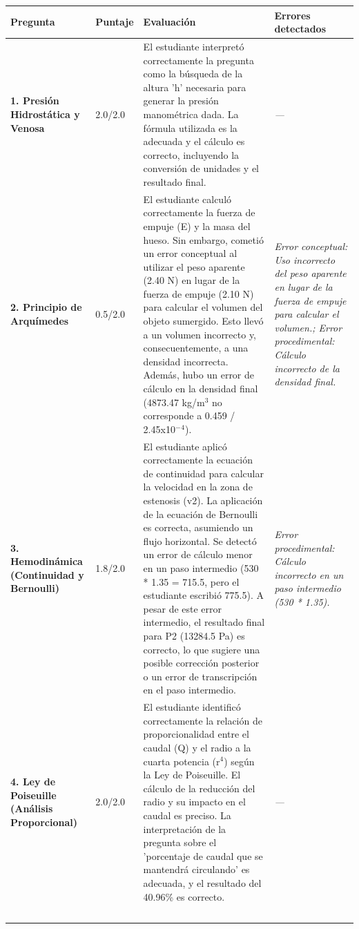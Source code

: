 \documentclass[11pt,a4paper]{article}
\begin{document}
\begin{longtable}{>{\bfseries}p{2.8cm} p{1.6cm} p{7.0cm} p{2.8cm}}
  \toprule
  \textbf{Pregunta} & \textbf{Puntaje} & \textbf{Evaluación} & \textbf{Errores detectados} \\
  \midrule
  \endhead
  \bottomrule
  \endfoot
    \textbf{1. Presión Hidrostática y Venosa} & 2.0/2.0 & El estudiante interpretó correctamente la pregunta como la búsqueda de la altura 'h' necesaria para generar la presión manométrica dada. La fórmula utilizada es la adecuada y el cálculo es correcto, incluyendo la conversión de unidades y el resultado final. & \textit{---} \\
    \midrule
    \textbf{2. Principio de Arquímedes} & 0.5/2.0 & El estudiante calculó correctamente la fuerza de empuje (E) y la masa del hueso. Sin embargo, cometió un error conceptual al utilizar el peso aparente (2.40 N) en lugar de la fuerza de empuje (2.10 N) para calcular el volumen del objeto sumergido. Esto llevó a un volumen incorrecto y, consecuentemente, a una densidad incorrecta. Además, hubo un error de cálculo en la densidad final (4873.47 kg/m$^{3}$ no corresponde a 0.459 / 2.45x10$^{-}$$^{4}$). & \textit{Error conceptual: Uso incorrecto del peso aparente en lugar de la fuerza de empuje para calcular el volumen.; Error procedimental: Cálculo incorrecto de la densidad final.} \\
    \midrule
    \textbf{3. Hemodinámica (Continuidad y Bernoulli)} & 1.8/2.0 & El estudiante aplicó correctamente la ecuación de continuidad para calcular la velocidad en la zona de estenosis (v2). La aplicación de la ecuación de Bernoulli es correcta, asumiendo un flujo horizontal. Se detectó un error de cálculo menor en un paso intermedio (530 * 1.35 = 715.5, pero el estudiante escribió 775.5). A pesar de este error intermedio, el resultado final para P2 (13284.5 Pa) es correcto, lo que sugiere una posible corrección posterior o un error de transcripción en el paso intermedio. & \textit{Error procedimental: Cálculo incorrecto en un paso intermedio (530 * 1.35).} \\
    \midrule
    \textbf{4. Ley de Poiseuille (Análisis Proporcional)} & 2.0/2.0 & El estudiante identificó correctamente la relación de proporcionalidad entre el caudal (Q) y el radio a la cuarta potencia (r$^{4}$) según la Ley de Poiseuille. El cálculo de la reducción del radio y su impacto en el caudal es preciso. La interpretación de la pregunta sobre el 'porcentaje de caudal que se mantendrá circulando' es adecuada, y el resultado del 40.96\% es correcto. & \textit{---} \\
$$
\end{longtable}
\end{document}
